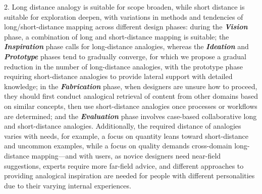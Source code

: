 2. Long distance analogy is suitable for scope broaden, while short distance is suitable for exploration deepen, with variations in methods and tendencies of long/short-distance mapping across different design phases: during the \textit{\textbf{Vision}} phase, a combination of long and short-distance mapping is suitable; the \textit{\textbf{Inspiration}} phase calls for long-distance analogies\cite{kang2025biospark}, whereas the \textbf{\textit{Ideation}} and \textbf{\textit{Prototype}} phases tend to gradually converge, for which we propose a gradual reduction in the number of long-distance analogies, with the prototype phase requiring short-distance analogies to provide lateral support with detailed knowledge\cite{tseng2008role}; in the \textbf{\textit{Fabrication}} phase, when designers are unsure how to proceed, they should first conduct analogical retrieval of content from other domains based on similar concepts\cite{emerson2024anther, schulz2014design}, then use short-distance analogies once processes or workflows are determined\cite{dimassi2023knowledge, khosravani2022intelligent}; and the \textbf{\textit{Evaluation}} phase involves case-based collaborative long and short-distance analogies\cite{thomas2013extending}. Additionally, the required distance of analogies varies with needs, for example, a focus on quantity leans toward short-distance and uncommon examples, while a focus on quality demands cross-domain long-distance mapping—and with users, as novice designers need near-field suggestions, experts require more far-field advice, and different approaches to providing analogical inspiration are needed for people with different personalities due to their varying internal experiences\cite{chan2011benefits, song2018characterizing, chai2015behavioral}. 


